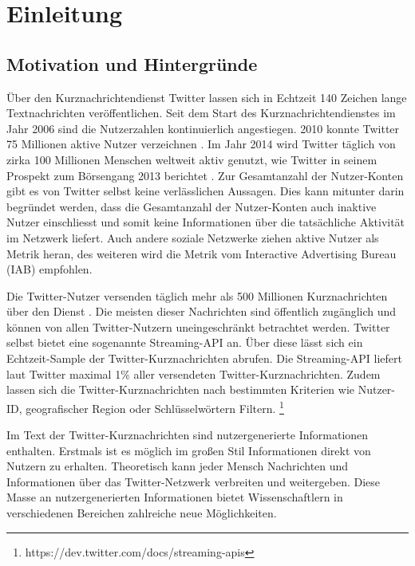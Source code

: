 \chapter{Einleitung}\label{chp:Einleitung}

	\section{Motivation und Hintergründe}

		Über den Kurznachrichtendienst Twitter lassen sich in Echtzeit 140 Zeichen lange Textnachrichten veröffentlichen.
		Seit dem Start des Kurznachrichtendienstes im Jahr 2006 sind die Nutzerzahlen kontinuierlich angestiegen.
		2010 konnte Twitter 75 Millionen aktive Nutzer verzeichnen \cite{Cheng2010}.
		Im Jahr 2014 wird Twitter täglich von zirka 100 Millionen Menschen weltweit aktiv genutzt, wie Twitter in seinem Prospekt zum Börsengang 2013 berichtet \cite{twitterinc2013}.  
		Zur Gesamtanzahl der Nutzer-Konten gibt es von Twitter selbst keine verlässlichen Aussagen. 
		Dies kann mitunter darin begründet werden, dass die Gesamtanzahl der Nutzer-Konten auch inaktive Nutzer einschliesst und somit keine Informationen über die tatsächliche Aktivität im Netzwerk liefert. 
		Auch andere soziale Netzwerke ziehen aktive Nutzer als Metrik heran, des weiteren wird die Metrik vom Interactive Advertising Bureau (IAB) empfohlen. \cite{IAB}
		
		Die Twitter-Nutzer versenden täglich mehr als 500 Millionen Kurznachrichten über den Dienst \cite{twitterinc2013}.
		Die meisten dieser Nachrichten sind öffentlich zugänglich und können von allen Twitter-Nutzern uneingeschränkt betrachtet werden. 
		Twitter selbst bietet eine sogenannte Streaming-API an.
		Über diese lässt sich ein Echtzeit-Sample der Twitter-Kurznachrichten abrufen. 
		Die Streaming-API liefert laut Twitter maximal 1\% aller versendeten Twitter-Kurznachrichten.
		Zudem lassen sich die Twitter-Kurznachrichten nach bestimmten Kriterien wie Nutzer-ID, geografischer Region oder Schlüsselwörtern Filtern. \footnote{https://dev.twitter.com/docs/streaming-apis} 

		Im Text der Twitter-Kurznachrichten sind nutzergenerierte Informationen enthalten.  
		Erstmals ist es möglich im großen Stil Informationen direkt von Nutzern zu erhalten. 
		Theoretisch kann jeder Mensch Nachrichten und Informationen über das Twitter-Netzwerk verbreiten und weitergeben. 
		Diese Masse an nutzergenerierten Informationen bietet Wissenschaftlern in verschiedenen Bereichen zahlreiche neue Möglichkeiten.

